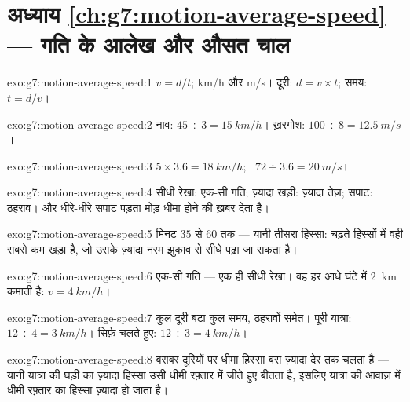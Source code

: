 \section*{अध्याय \ref{ch:g7:motion-average-speed} --- गति के आलेख और औसत चाल}

\begin{solution}{exo:g7:motion-average-speed:1}
$v = d/t$;  \unit{km/h} और \unit{m/s}। दूरी: $d = v \times t$;
समय: $t = d/v$।
\end{solution}

\begin{solution}{exo:g7:motion-average-speed:2}
नाव: $45 \div 3 = \qty{15}{km/h}$। ख़रगोश: $100 \div 8 =
\qty{12.5}{m/s}$।
\end{solution}

\begin{solution}{exo:g7:motion-average-speed:3}
$5 \times 3.6 = \qty{18}{km/h}$; \ $72 \div 3.6 = \qty{20}{m/s}$।
\end{solution}

\begin{solution}{exo:g7:motion-average-speed:4}
सीधी रेखा: एक-सी गति; ज़्यादा खड़ी: ज़्यादा तेज़; सपाट: ठहराव। और
धीरे-धीरे सपाट पड़ता मोड़ धीमा होने की ख़बर देता है।
\end{solution}

\begin{solution}{exo:g7:motion-average-speed:5}
मिनट $35$ से $60$ तक --- यानी तीसरा हिस्सा: चढ़ते हिस्सों में वही सबसे
कम खड़ा है, जो उसके ज़्यादा नरम झुकाव से सीधे पढ़ा जा सकता है।
\end{solution}

\begin{solution}{exo:g7:motion-average-speed:6}
एक-सी गति --- एक ही सीधी रेखा। वह हर आधे घंटे में \qty{2}{km} कमाती
है: $v = \qty{4}{km/h}$।
\end{solution}

\begin{solution}{exo:g7:motion-average-speed:7}
कुल दूरी बटा कुल समय, ठहरावों समेत। पूरी यात्रा: $12 \div 4 =
\qty{3}{km/h}$। सिर्फ़ चलते हुए: $12 \div 3 = \qty{4}{km/h}$।
\end{solution}

\begin{solution}{exo:g7:motion-average-speed:8}
बराबर दूरियों पर धीमा हिस्सा बस ज़्यादा देर तक चलता है --- यानी
यात्रा की घड़ी का ज़्यादा हिस्सा उसी धीमी रफ़्तार में जीते हुए बीतता
है, इसलिए यात्रा की आवाज़ में धीमी रफ़्तार का हिस्सा ज़्यादा हो जाता
है।
\end{solution}

